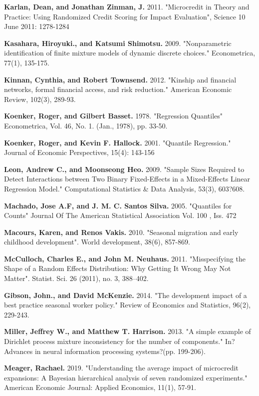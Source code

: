\documentclass[AER]{AEA}
\begin{document}
\begin{thebibliography}{99}
  \textbf{ Karlan, Dean, and Jonathan Zinman, J.} 2011. "Microcredit in Theory and Practice: Using Randomized Credit Scoring for Impact Evaluation", Science 10 June 2011: 1278-1284
 
  \textbf{ Kasahara, Hiroyuki., and Katsumi Shimotsu.} 2009. "Nonparametric identification of finite mixture models of dynamic discrete choices." Econometrica, 77(1), 135-175.
 
 \textbf{ Kinnan, Cynthia, and Robert Townsend.} 2012. "Kinship and financial networks, formal financial access, and risk reduction." American Economic Review, 102(3), 289-93.

 \textbf{ Koenker, Roger, and Gilbert Basset.} 1978. "Regression Quantiles"  Econometrica, Vol. 46, No. 1. (Jan., 1978), pp. 33-50.

 \textbf{ Koenker, Roger, and Kevin F. Hallock.} 2001. "Quantile Regression." Journal of Economic Perspectives, 15(4): 143-156

 \textbf{ Leon, Andrew C., and Moonseong Heo.} 2009. "Sample Sizes Required to Detect Interactions between Two Binary Fixed-Effects in a Mixed-Effects Linear Regression Model." Computational Statistics \& Data Analysis, 53(3), 603?608.

 \textbf{ Machado, Jose A.F, and J. M. C. Santos Silva.} 2005. "Quantiles for Counts" Journal Of The American Statistical Association Vol. 100 , Iss. 472

 \textbf{ Macours, Karen, and Renos Vakis.} 2010. "Seasonal migration and early childhood development". World development, 38(6), 857-869.

 \textbf{ McCulloch, Charles E., and John M. Neuhaus.} 2011. "Misspecifying the Shape of a Random Effects Distribution: Why Getting It Wrong May Not Matter". Statist. Sci. 26 (2011), no. 3, 388--402.

 \textbf{ Gibson, John., and David McKenzie.} 2014. "The development impact of a best practice seasonal worker policy." Review of Economics and Statistics, 96(2), 229-243.

 \textbf{ Miller, Jeffrey W., and Matthew T. Harrison.} 2013. "A simple example of Dirichlet process mixture inconsistency for the number of components." In?Advances in neural information processing systems?(pp. 199-206).

 \textbf{ Meager, Rachael.} 2019. "Understanding the average impact of microcredit expansions: A Bayesian hierarchical analysis of seven randomized experiments." American Economic Journal: Applied Economics, 11(1), 57-91.


\end{thebibliography}
\end{document}
